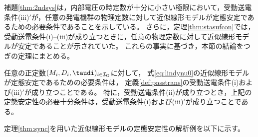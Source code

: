 \documentclass[tombow,dvipdfmx]{corona-a5-1.1}
\begin{document}
補題\ref{thm:2ndsys}は，内部電圧の時定数が十分に小さい極限において，受動送電条件(iii)$'$が，任意の発電機群の物理定数に対して近似線形モデルが定態安定であるための必要条件であることを示している。
さらに，定理\ref{thm:stasufcon}では，受動送電条件(i)--(iii)が成り立つときに，任意の物理定数に対して近似線形モデルが安定であることが示されていた。
これらの事実に基づき，本節の結論をつぎの定理にまとめる。


\begin{定理}[近似線形モデルの定態安定性]\label{thm:sync}
任意の正定数$(M_i,D_i,\taudi)_{i \in \mathcal{I}_{\rm G}}$に対して，
式\ref{eq:lindynu0}の近似線形モデルが定態安定であるための必要条件は，
定義\ref{def:passtrans}の受動送電条件(i)および(iii)$'$が成り立つことである。
特に，受動送電条件(ii)が成り立つとき，上記の定態安定性の必要十分条件は，受動送電条件(i)および(iii)$'$が成り立つことである。
\end{定理}


定理\ref{thm:sync}を用いた近似線形モデルの定態安定性の解析例を以下に示す。
\end{document}
